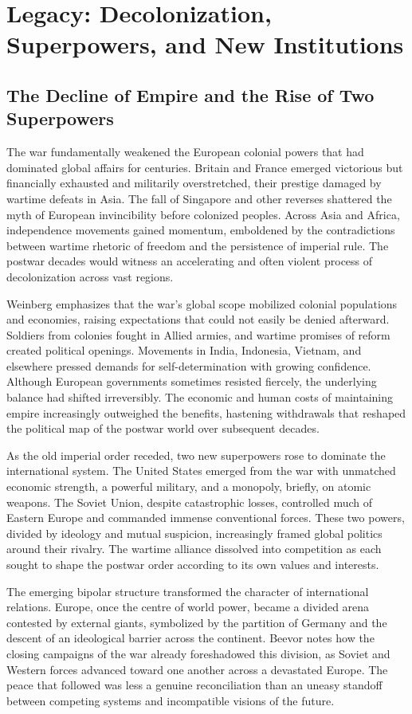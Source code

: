 \section{Legacy: Decolonization, Superpowers, and New Institutions}

\subsection{The Decline of Empire and the Rise of Two Superpowers}
The war fundamentally weakened the European colonial powers that had dominated global affairs for centuries. Britain and France emerged victorious but financially exhausted and militarily overstretched, their prestige damaged by wartime defeats in Asia. The fall of Singapore and other reverses shattered the myth of European invincibility before colonized peoples. Across Asia and Africa, independence movements gained momentum, emboldened by the contradictions between wartime rhetoric of freedom and the persistence of imperial rule. The postwar decades would witness an accelerating and often violent process of decolonization across vast regions.

Weinberg emphasizes that the war's global scope mobilized colonial populations and economies, raising expectations that could not easily be denied afterward. Soldiers from colonies fought in Allied armies, and wartime promises of reform created political openings. Movements in India, Indonesia, Vietnam, and elsewhere pressed demands for self-determination with growing confidence. Although European governments sometimes resisted fiercely, the underlying balance had shifted irreversibly. The economic and human costs of maintaining empire increasingly outweighed the benefits, hastening withdrawals that reshaped the political map of the postwar world over subsequent decades.

As the old imperial order receded, two new superpowers rose to dominate the international system. The United States emerged from the war with unmatched economic strength, a powerful military, and a monopoly, briefly, on atomic weapons. The Soviet Union, despite catastrophic losses, controlled much of Eastern Europe and commanded immense conventional forces. These two powers, divided by ideology and mutual suspicion, increasingly framed global politics around their rivalry. The wartime alliance dissolved into competition as each sought to shape the postwar order according to its own values and interests.

The emerging bipolar structure transformed the character of international relations. Europe, once the centre of world power, became a divided arena contested by external giants, symbolized by the partition of Germany and the descent of an ideological barrier across the continent. Beevor notes how the closing campaigns of the war already foreshadowed this division, as Soviet and Western forces advanced toward one another across a devastated Europe. The peace that followed was less a genuine reconciliation than an uneasy standoff between competing systems and incompatible visions of the future.

